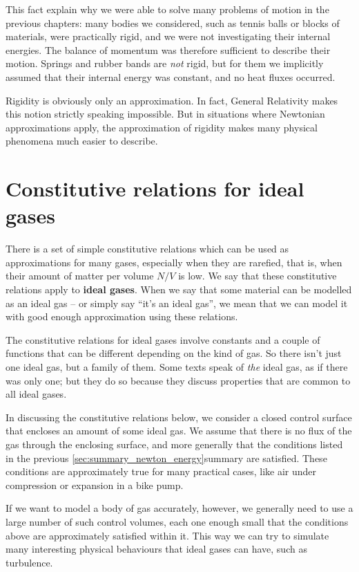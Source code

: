 \documentclass[a4paper,12pt,%
onecolumn,oneside,%
british%
]{memoir}
\renewcommand*{\|}[1][]{\nonscript\:#1\vert\nonscript\:\mathopen{}}
\newcommand*{\yN}{N}
\begin{document}
This fact explain why we were able to solve many problems of motion in the previous chapters: many bodies we considered, such as tennis balls or blocks of materials, were practically rigid, and we were not investigating their internal energies. The balance of momentum was therefore sufficient to describe their motion. Springs and rubber bands are \emph{not} rigid, but for them we implicitly assumed that their internal energy was constant, and no heat fluxes occurred.

\medskip

Rigidity is obviously only an approximation. In fact, General Relativity makes this notion strictly speaking impossible. But in situations where Newtonian approximations apply, the approximation of rigidity makes many physical phenomena much easier to describe.

\section{Constitutive relations for ideal gases}
\label{sec:int_energy_idealgas}

There is a set of simple constitutive relations which can be used as approximations for many gases, especially when they are rarefied, that is, when their amount of matter per volume $\yN/V$ is low. We say that these constitutive relations apply to \textbf{ideal gases}. When we say that some material can be modelled as an ideal gas -- or simply say \enquote{it's an ideal gas}, we mean that we can model it with good enough approximation using these relations.

The constitutive relations for ideal gases involve constants and a couple of functions that can be different depending on the kind of gas. So there isn't just one ideal gas, but a family of them. Some texts speak of \emph{the} ideal gas, as if there was only one; but they do so because they discuss properties that are common to all ideal gases.

\medskip

In discussing the constitutive relations below, we consider a closed control surface that encloses an amount of some ideal gas. We assume that there is no flux of the gas through the enclosing surface, and more generally that the conditions listed in the previous \ref{sec:summary_newton_energy}{summary} are satisfied. These conditions are approximately true for many practical cases, like air under compression or expansion in a bike pump.

If we want to model a body of gas accurately, however, we generally need to use a large number of such control volumes, each one enough small that the conditions above are approximately satisfied within it. This way we can try to simulate many interesting physical behaviours that ideal gases can have, such as turbulence.
\end{document}

